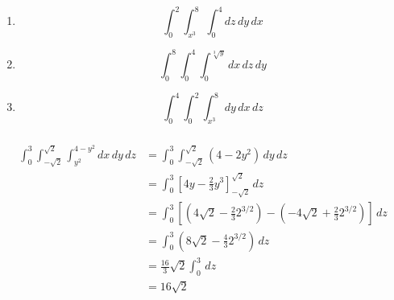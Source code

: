 \documentclass{article}
\begin{document}
\setcounter{subsubsection}{12}
\subsubsection{}

\begin{enumerate}
  \item \[\int_0^2 \int_{x^3}^8 \int_0^4 dz \,dy \,dx\]

  \item \[\int_0^8 \int_0^4 \int_0^{\sqrt[3]{y}} dx \,dz \,dy\]

  \item \[\int_0^4 \int_0^2 \int_{x^3}^8 dy \,dx \,dz\]
\end{enumerate}

\setcounter{subsubsection}{20}
\subsubsection{}

\begin{align*}
  \int_0^3 \int_{-\sqrt{2}}^{\sqrt{2}} \int_{y^2}^{4 - y^2} dx \,dy \,dz & = \int_0^3 \int_{-\sqrt{2}}^{\sqrt{2}} (4 - 2 y^2) \,dy \,dz                                                                          \\
                                                                         & = \int_0^3 \left[ 4 y - \frac{2}{3} y^3 \right]_{-\sqrt{2}}^{\sqrt{2}} \,dz                                                           \\
                                                                         & = \int_0^3 \left[ \left( 4 \sqrt{2} - \frac{2}{3} 2^{3 / 2} \right) - \left( -4 \sqrt{2} + \frac{2}{3} 2^{3 / 2} \right) \right] \,dz \\
                                                                         & = \int_0^3 \left( 8 \sqrt{2} - \frac{4}{3} 2^{3 / 2} \right) \,dz                                                                     \\
                                                                         & = \frac{16}{3} \sqrt{2} \int_0^3 \,dz                                                                                                 \\
                                                                         & = 16 \sqrt{2}
\end{align*}

\setcounter{subsubsection}{24}
\subsubsection{}
\end{document}
